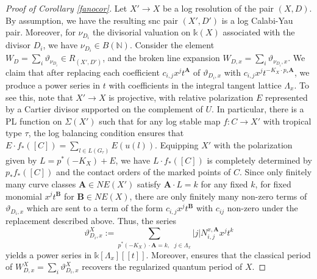 \documentclass[12pt, oneside]{amsart}   	%
\newcounter{thm}
\newtheorem{remark}[thm]{Remark}
\newcommand{\NN}{\mathbb{N}}
\newcommand{\kk}{\mathds{k}}
\numberwithin{equation}{section}
\numberwithin{thm}{section}
\numberwithin{figure}{section}
\begin{document}
  \begin{proof}[Proof of Corollary \ref{fanocor}]
Let $X' \rightarrow X$ be a log resolution of the pair $(X,D)$. By assumption, we have the resulting snc pair $(X',D')$ is a log Calabi-Yau pair. Moreover, for $\nu_{D_i}$ the divisorial valuation on $\kk(X)$ associated with the divisor $D_i$, we have $\nu_{D_i} \in B(\NN)$. Consider the element $W_{D}  =\sum_{i} \vartheta_{\nu_{D_i}} \in R_{(X',D')}$, and the broken line expansion $W_{D,x} = \sum_{i} \vartheta_{\nu_{D_i},x}$. We claim that after replacing each coefficient $c_{i,j}x^jt^{\textbf{A}}$ of $\vartheta_{D_i,x}$ with $c_{i,j}x^jt^{-K_X\cdot p_*\textbf{A}}$, we produce a power series in $t$ with coefficients in the integral tangent lattice $\Lambda_x$. To see this, note that $X' \rightarrow X$ is projective, with relative polarization $E$ represented by a Cartier divisor supported on the complement of $U$. In particular, there is a PL function on $\Sigma(X')$ such that for any log stable map $f: C \rightarrow X'$ with tropical type $\tau$, the log balancing condition ensures that $E\cdot f_*([C]) = \sum_{l \in L(G_{\tau})} E(u(l))$. Equipping $X'$ with the polarization given by $L = p^*(-K_X) + E$, we have $L\cdot f_*([C])$ is completely determined by $p_*f_*([C])$ and the contact orders of the marked points of $C$. Since only finitely many curve classes $\textbf{A} \in NE(X')$ satisfy $\textbf{A}\cdot L = k$ for any fixed $k$, for fixed monomial $x^{j}t^{\textbf{B}}$ for $\textbf{B} \in NE(X)$, there are only finitely many non-zero terms of $\vartheta_{D_i,x}$ which are sent to a term of the form $c_{i,j}x^jt^{\textbf{B}}$ with $c_{ij}$ non-zero under the replacement described above. Thus, the series 
$$\vartheta_{D_i,x}^X := \sum_{p^*(-K_X)\cdot \textbf{A} = k,\text{ }j \in \Lambda_x} |j|N_{i,j}^{x,\textbf{A}}x^jt^k$$
yields a power series in $\kk[\Lambda_x][[t]]$. Moreover, \cite[Theorem $1.1$]{qpint} ensures that the classical period of $W_{D,x}^X = \sum_i \vartheta_{D_i,x}^X$ recovers the regularized quantum period of $X$. 
  \end{proof}

 
 
\end{document}
